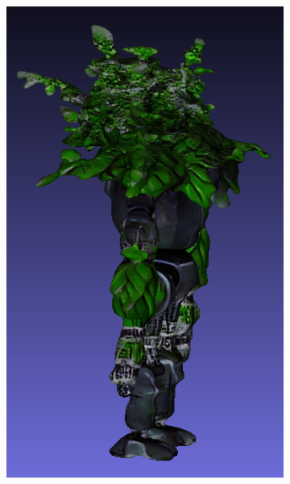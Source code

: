 \begin{figure}[H]
\begin{subfigure}[b]{0.26\textwidth}
        \caption{}
    \end{subfigure}
    \begin{subfigure}[b]{0.16\textwidth}
        \centering
        \includegraphics[width=\textwidth]{etc/Genie/plantRobot_fine_side.png}
        \caption{}
    \end{subfigure}
    \begin{subfigure}[b]{0.27\textwidth}
        \centering

\end{subfigure}
\end{figure}
